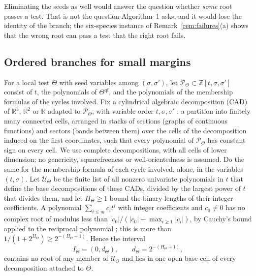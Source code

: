 \documentclass[11pt,a4paper]{article}
\theoremstyle{plain}
\theoremstyle{definition}
\theoremstyle{remark}
\newcommand{\R}{\mathbb{R}}
\newcommand{\Z}{\mathbb{Z}}
\begin{document}
Eliminating the seeds as well would answer the question whether \emph{some} root passes a test. That is not the question Algorithm~1 asks, and it would lose the identity of the branch; the six-species instance of Remark~\ref{rem:failures}(a) shows that the wrong root can pass a test that the right root fails.

\subsection{Ordered branches for small margins}
For a local test $\Theta$ with seed variables among $(\sigma,\sigma')$, let $\mathcal{P}_\Theta\subset\Z[t,\sigma,\sigma']$ consist of $t$, the polynomials of $\Theta^{\mathrm{qf}}$, and the polynomials of the membership formulas of the cycles involved. Fix a cylindrical algebraic decomposition (CAD) of $\R^3$, $\R^2$ or $\R$ adapted to $\mathcal{P}_\Theta$, with variable order $t,\sigma,\sigma'$ \citep{collins1975,bpr2006}: a partition into finitely many connected cells, arranged in stacks of sections (graphs of continuous functions) and sectors (bands between them) over the cells of the decomposition induced on the first coordinates, such that every polynomial of $\mathcal{P}_\Theta$ has constant sign on every cell. We use complete decompositions, with all cells of lower dimension; no genericity, squarefreeness or well-orientedness is assumed. Do the same for the membership formula of each cycle involved, alone, in the variables $(t,\sigma)$. Let $\mathcal{U}_\Theta$ be the finite list of all nonzero univariate polynomials in $t$ that define the base decompositions of these CADs, divided by the largest power of $t$ that divides them, and let $H_\Theta\ge1$ bound the binary lengths of their integer coefficients. A polynomial $\sum_{i\le m}c_it^i$ with integer coefficients and $c_0\ne0$ has no complex root of modulus less than $|c_0|/(|c_0|+\max_{i\ge1}|c_i|)$, by Cauchy's bound applied to the reciprocal polynomial \citep{mignotte1992}; this is more than $1/(1+2^{H_\Theta})\ge2^{-(H_\Theta+1)}$. Hence the interval
\begin{equation}\label{eq:dtheta}
   I_\Theta=(0,d_\Theta),\qquad d_\Theta=2^{-(H_\Theta+1)},
\end{equation}
contains no root of any member of $\mathcal{U}_\Theta$ and lies in one open base cell of every decomposition attached to $\Theta$.
\end{document}
